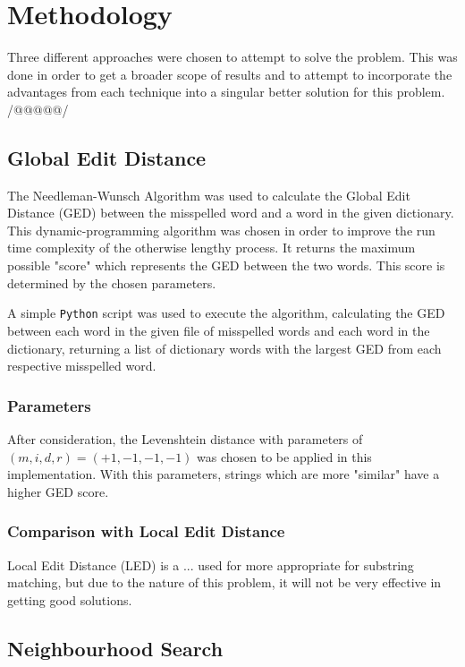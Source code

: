 \documentclass[11pt]{article}
\begin{document}
\section{Methodology}
Three different approaches were chosen to attempt to solve the problem. This was done in order to get a broader scope of results and to attempt to incorporate the advantages from each technique into a singular better solution for this problem. /@@@@@/



\subsection{Global Edit Distance}
The Needleman-Wunsch Algorithm %
was used to calculate the Global Edit Distance (GED) between the misspelled word and a word in the given dictionary. This dynamic-programming algorithm was chosen in order to improve the run time complexity of the otherwise lengthy process. It returns the maximum possible "score" which represents the GED between the two words. This score is determined by the chosen parameters. 

A simple \texttt{Python} script was used to execute the algorithm, calculating the GED between each word in the given file of misspelled words and each word in the dictionary, returning a list of dictionary words with the largest GED from each respective misspelled word.

\subsubsection{Parameters}
After consideration, the Levenshtein distance %
with parameters of \((m, i, d, r) = (+1, -1, -1, -1)\) was chosen to be applied in this implementation. With this parameters, strings which are more "similar" have a higher GED score. %

\subsubsection{Comparison with Local Edit Distance}
Local Edit Distance (LED) is a ... used for  more appropriate for substring matching, but due to the nature of this problem, it will not be very effective in getting good solutions.



\subsection{Neighbourhood Search}
\end{document}

